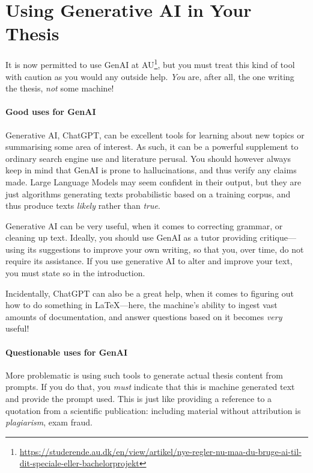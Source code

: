 \section*{Using Generative AI in Your Thesis}
\label{sec:using-generative-ai}

It is now permitted to use GenAI at AU\footnote{\url{https://studerende.au.dk/en/view/artikel/nye-regler-nu-maa-du-bruge-ai-til-dit-speciale-eller-bachelorprojekt}}, but you must treat this kind of tool with caution as you would any outside help. \emph{You} are, after all, the one writing the thesis, \emph{not} some machine!

\paragraph{Good uses for GenAI} Generative AI, \eg ChatGPT, can be excellent tools for learning about new topics or summarising some area of interest. As such, it can be a powerful supplement to ordinary search engine use and literature perusal. You should however always keep in mind that GenAI is prone to hallucinations, and thus verify any claims made. Large Language Models may seem confident in their output, but they are just algorithms generating texts probabilistic based on a training corpus, and thus produce texts  \emph{likely} rather than \emph{true}.

Generative AI can be very useful, when it comes to correcting grammar, or cleaning up text. Ideally, you should use GenAI as a tutor providing critique---using its suggestions to improve your own writing, so that you, over time, do not require its assistance. If you use generative AI to alter and improve your text, you must state so in the introduction. 

Incidentally, ChatGPT can also be a great help, when it comes to figuring out how to do something in \LaTeX---here, the machine's ability to ingest vast amounts of documentation, and answer questions based on it becomes \emph{very} useful!

\paragraph{Questionable uses for GenAI} More problematic is using such tools to generate actual thesis content from prompts. If you do that, you \emph{must} indicate that this is machine generated text and provide the prompt used. This is just like providing a reference to a quotation from a scientific publication: including material without attribution is \emph{plagiarism}, \ie exam fraud.


